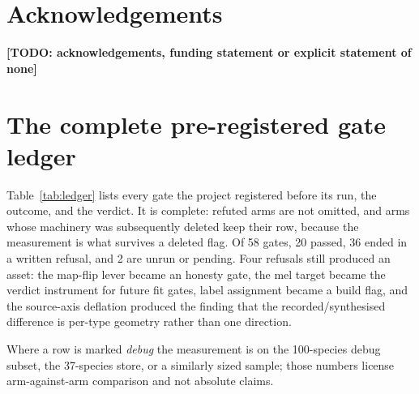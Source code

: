 \documentclass[10pt,twocolumn,a4paper]{article}
\newcommand{\todo}[1]{{\color{red}\textbf{[TODO: #1]}}}
\begin{document}
\section*{Acknowledgements}

\todo{acknowledgements, funding statement or explicit statement of none}




\appendix

\onecolumn
\section{The complete pre-registered gate ledger}
\label{app:ledger}

Table~\ref{tab:ledger} lists every gate the project registered before its run, the outcome,
and the verdict. It is complete: refuted arms are not omitted, and arms whose machinery was
subsequently deleted keep their row, because the measurement is what survives a deleted flag.
Of 58 gates, 20 passed, 36 ended in a written refusal, and 2 are unrun or pending. Four
refusals still produced an asset: the map-flip lever became an honesty gate, the mel target
became the verdict instrument for future fit gates, label assignment became a build flag, and
the source-axis deflation produced the finding that the recorded/synthesised difference is
per-type geometry rather than one direction.

Where a row is marked \emph{debug} the measurement is on the 100-species debug subset, the
37-species store, or a similarly sized sample; those numbers license arm-against-arm
comparison and not absolute claims.
\end{document}
